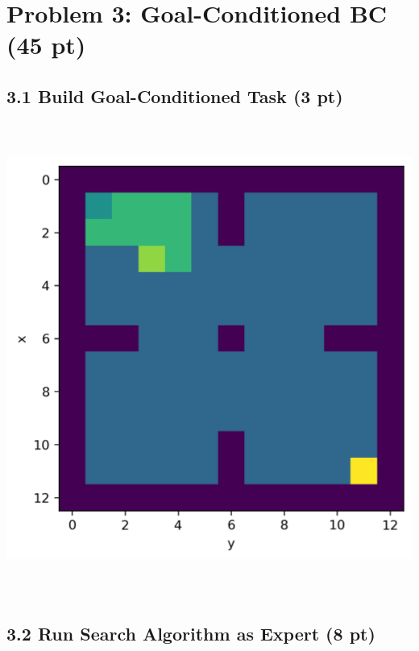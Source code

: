 \documentclass[12pt]{article}
\begin{document}
\clearpage
\section*{Problem 3: Goal-Conditioned BC (45 pt)}

\subsection*{3.1 Build Goal-Conditioned Task (3 pt)}
\includegraphics[height= 15.5cm, width=15.5cm]{p3-1-1}



\subsection*{3.2 Run Search Algorithm as Expert (8 pt)}
\end{document}

